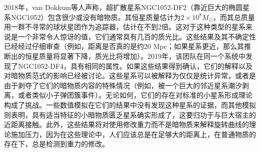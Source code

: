 
2018年，van Dokkum等人声称，超扩散星系NGC1052-DF2（靠近巨大的椭圆星系NGC1052）包含很少或没有暗物质。其恒星质量估计为$2 \times 10^8 M_\odot$，而其总质量用一群不寻常的球状星团作为追踪器，估计在不到2倍。这对于这种类型的星系来说是一个非常令人惊讶的值，它们通常具有几百的质光比。这些结果及其不确定性已经经过仔细审查（例如，距离是否真的是约20 Mpc；如果星系更近，那么其推断出的恒星质量将显著下降，质光比将增加）。2019年，该团队在同一个系统中发现了NGC1052-DF4，具有相同的属性。如果这些结果得到确认，它们的解释以及对暗物质范式的影响已经被讨论。这些星系可以被解释为仅仅是统计异常，或者是由于剥夺了它们的暗物质内容的特殊情况（例如，被一个巨大的邻近星系潮汐剥离，或者类似小子弹团簇事件）。无论如何，它们的存在对标准的小星系形成理论构成了挑战。一些数值模拟在它们的结果中没有发现这种星系的证据，而其他模拟则表明，具有适当特征的小暗物质匮乏星系确实形成了，这要归功于与巨大宿主的近距离接触。此外，这些结果将对使用修改重力而不是暗物质来解释旋转曲线的理论施加压力，因为在这些理论中，人们应该总是在足够大的距离上，在普通物质的存在下，总是检测到重力的修改。